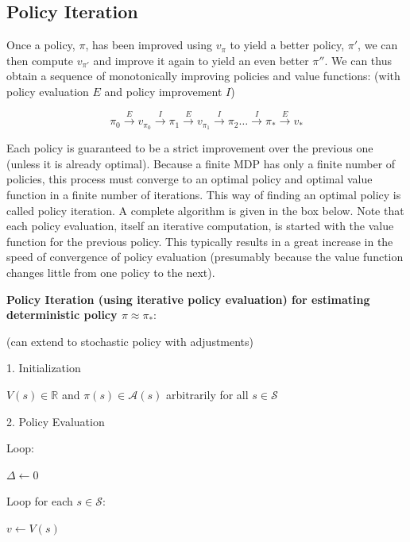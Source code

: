 \documentclass{article}
\begin{document}
\subsection{Policy Iteration}

Once a policy, \(\pi\), has been improved using \(v_{\pi}\) to yield a better policy, \(\pi'\), we can then compute \(v_{\pi'}\) and improve it again to yield an even better \(\pi''\). 
We can thus obtain a sequence of monotonically improving policies and value functions: (with policy evaluation \(E\) and policy improvement \(I\))

\[\pi_0 \overset{E}{\rightarrow} v_{\pi_0} \overset{I}{\rightarrow} \pi_1  \overset{E}{\rightarrow} v_{\pi_1} \overset{I}{\rightarrow} \pi_2 \dots \overset{I}{\rightarrow} \pi_*  \overset{E}{\rightarrow} v_*\]

Each policy is guaranteed to be a strict improvement over the previous one (unless it is already optimal). Because a finite MDP has only a finite number of policies, 
this process must converge to an optimal policy and optimal value function in a finite number of iterations. This way of finding an optimal policy is called policy iteration. 
A complete algorithm is given in the box below. Note that each policy evaluation, itself an iterative computation, is started with the value function for the previous policy. 
This typically results in a great increase in the speed of convergence of policy evaluation (presumably because the value function changes little from one policy to the next).

\textbf{Policy Iteration (using iterative policy evaluation) for estimating deterministic policy \(\pi \approx \pi_*\)}:

(can extend to stochastic policy with adjustments)

1. Initialization

\hspace{.5cm} \(V(s) \in \mathbb{R}\) and \(\pi(s) \in \mathcal{A}(s)\) arbitrarily for all \(s \in \mathcal{S}\)

2. Policy Evaluation

\hspace{.5cm} Loop:

\hspace{1cm} \(\Delta \leftarrow 0\)

\hspace{1cm} Loop for each \(s \in \mathcal{S}\):

\hspace{1.5cm} \(v \leftarrow V(s)\)
\end{document}
